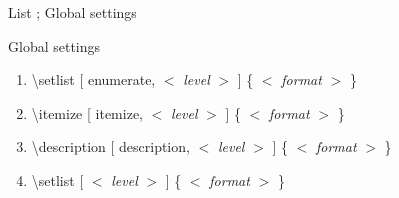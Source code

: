 \documentclass[ aspectratio=149,  10pt,blue,xcolor=pdftex,dvipsnames,table,handout,notes]{beamer}
\begin{document}
		\begin{frame}[c]{List ; Global settings}

			\begin{block} {Global settings}
			\begin{enumerate}
			\item	\textbackslash setlist [ enumerate, $<$ \textit{level} $>$ ] \{ $<$ \textit{format} $>$ \}
			\item	\textbackslash itemize [ itemize, $<$ \textit{level} $>$ ] \{ $<$ \textit{format} $>$ \}
			\item	\textbackslash description [ description, $<$ \textit{level} $>$ ] \{ $<$ \textit{format} $>$ \}
			\item	\textbackslash setlist [ $<$ \textit{level} $>$ ] \{ $<$ \textit{format} $>$ \}
			\end{enumerate}
			\end{block}

		\note[item]{}
		\end{frame}









		\begin{frame}[plain]
		\centering
		\scalebox{10}{표}

		\note[item]{}
		\end{frame}
\end{document}
